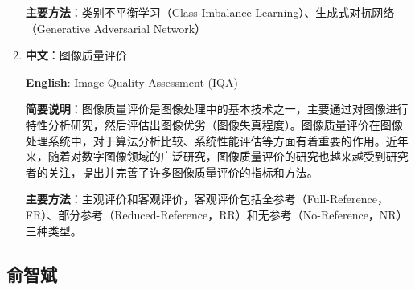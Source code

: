 \documentclass[14pt,a4paper]{extarticle}
\begin{document}
\begin{enumerate}
\textbf{主要方法}：类别不平衡学习（Class-Imbalance Learning）、生成式对抗网络（Generative Adversarial Network）
\item \textbf{中文}：图像质量评价

\textbf{English}: Image Quality Assessment (IQA)

\textbf{简要说明}：图像质量评价是图像处理中的基本技术之一，主要通过对图像进行特性分析研究，然后评估出图像优劣（图像失真程度）。图像质量评价在图像处理系统中，对于算法分析比较、系统性能评估等方面有着重要的作用。近年来，随着对数字图像领域的广泛研究，图像质量评价的研究也越来越受到研究者的关注，提出并完善了许多图像质量评价的指标和方法。

\textbf{主要方法}：主观评价和客观评价，客观评价包括全参考（Full-Reference，FR）、部分参考（Reduced-Reference，RR）和无参考（No-Reference，NR）三种类型。
\end{enumerate}

\subsection{俞智斌}
\end{document}
